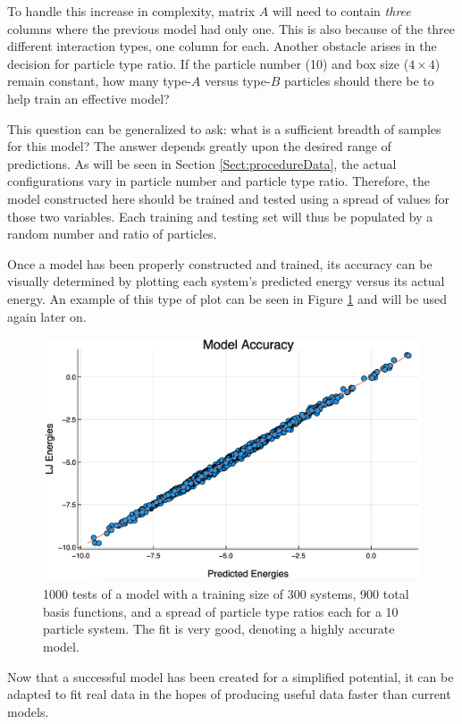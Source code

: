 \par To handle this increase in complexity, matrix $A$ will need to contain \textit{three} columns where the previous model had only one. This is also because of the three different interaction types, one column for each. Another obstacle arises in the decision for particle type ratio. If the particle number (10) and box size ($4\times4$) remain constant, how many type-$A$ versus type-$B$ particles should there be to help train an effective model?
\par This question can be generalized to ask: what is a sufficient breadth of samples for this model? The answer depends greatly upon the desired range of predictions. As will be seen in Section \ref{Sect:procedureData}, the actual configurations vary in particle number and particle type ratio. Therefore, the model constructed here should be trained and tested using a spread of values for those two variables. Each training and testing set will thus be populated by a random number and ratio of particles. 
\par Once a model has been properly constructed and trained, its accuracy can be visually determined by plotting each system's predicted energy versus its actual energy. An example of this type of plot can be seen in Figure \ref{fig:diatomicAccuracy} and will be used again later on.

\begin{figure}[h]
\includegraphics[scale = 0.3]{Figures/diatomicAccuracy}
\caption{1000 tests of a model with a training size of 300 systems, 900 total basis functions, and a spread of particle type ratios each for a 10 particle system. The fit is very good, denoting a highly accurate model.
\label{fig:diatomicAccuracy}}
\end{figure}

\par Now that a successful model has been created for a simplified potential, it can be adapted to fit real data in the hopes of producing useful data faster than current models.